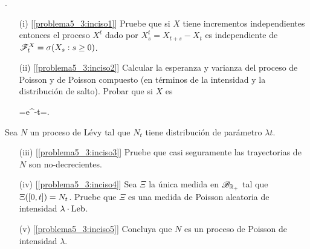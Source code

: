 \begin{problema}.\pn
	
	\begin{enumerate}
		\item[(i)]		[\ref{problema5_3:inciso1}]
			Pruebe que si $X$ tiene incrementos independientes entonces el proceso $X^t$ dado por $X^t_s=X_{t+s}-X_t$ 
			es independiente de $\mathscr{F}^X_t=\sigma\!\left( X_s:s\geq 0\right) $.

		\item[(ii)]		[\ref{problema5_3:inciso2}]
			Calcular la esperanza y varianza del proceso de Poisson y de Poisson compuesto (en t\'erminos de 
			la intensidad y la distribuci\'on de salto). Probar que si $X$ es
			\begin{esn}
				=e^{-\lambda t}\quad{}\quad {}=. 
			\end{esn}
	\end{enumerate}\pn
		Sea $N$ un proceso de L\'evy tal que $N_t$ tiene distribuci\'on de par\'ametro $\lambda t$. 

	\begin{enumerate}[resume]
		\item[(iii)]	[\ref{problema5_3:inciso3}] 
			Pruebe que casi seguramente las trayectorias de $N$ son no-decrecientes.
		\item[(iv)]		[\ref{problema5_3:inciso4}] 
			Sea $\Xi$ la \'unica medida en $\mathscr{B}_{\mathbb{R}_+}$ tal que $\Xi\!\left( [0,t]\right) =N_t$. Pruebe que 
			$\Xi$ es una medida de Poisson aleatoria de intensidad $\lambda \cdot\text{Leb}$.
		\item[(v)]		[\ref{problema5_3:inciso5}]
			Concluya que $N$ es un proceso de Poisson de intensidad $\lambda$. 
	\end{enumerate}
\end{problema}

